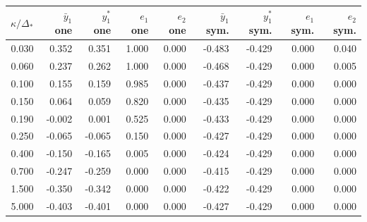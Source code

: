 \begin{tabular}{rrrrrrrrr}
\toprule
$\kappa/\Delta_\ast$ & $\bar y_1$ one & $y_1^\ast$ one & $e_1$ one & $e_2$ one & $\bar y_1$ sym. & $y_1^\ast$ sym. & $e_1$ sym. & $e_2$ sym. \\
\midrule
0.030 & 0.352 & 0.351 & 1.000 & 0.000 & -0.483 & -0.429 & 0.000 & 0.040 \\
0.060 & 0.237 & 0.262 & 1.000 & 0.000 & -0.468 & -0.429 & 0.000 & 0.005 \\
0.100 & 0.155 & 0.159 & 0.985 & 0.000 & -0.437 & -0.429 & 0.000 & 0.000 \\
0.150 & 0.064 & 0.059 & 0.820 & 0.000 & -0.435 & -0.429 & 0.000 & 0.000 \\
0.190 & -0.002 & 0.001 & 0.525 & 0.000 & -0.433 & -0.429 & 0.000 & 0.000 \\
0.250 & -0.065 & -0.065 & 0.150 & 0.000 & -0.427 & -0.429 & 0.000 & 0.000 \\
0.400 & -0.150 & -0.165 & 0.005 & 0.000 & -0.424 & -0.429 & 0.000 & 0.000 \\
0.700 & -0.247 & -0.259 & 0.000 & 0.000 & -0.415 & -0.429 & 0.000 & 0.000 \\
1.500 & -0.350 & -0.342 & 0.000 & 0.000 & -0.422 & -0.429 & 0.000 & 0.000 \\
5.000 & -0.403 & -0.401 & 0.000 & 0.000 & -0.427 & -0.429 & 0.000 & 0.000 \\
\bottomrule
\end{tabular}
